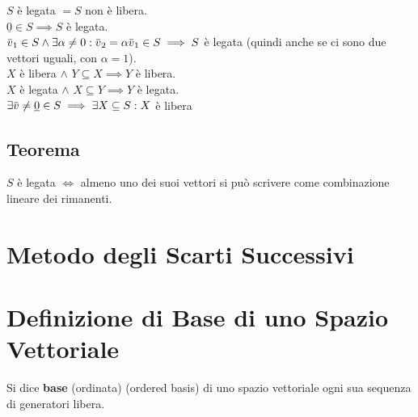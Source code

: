 \documentclass[a4paper, twoside, italian, 11pt]{book}
\newcommand{\braces}[1] {\left \{ #1 \right \}}
\newcommand{\overbar}[1] {\mkern 1.5mu\overline{\mkern-1.5mu#1\mkern-1.5mu}\mkern 1.5mu}
\begin{document}
\noindent
$S$ è legata $= S$ non è libera. \\
$\underline 0 \in S \implies S$ è legata. \\
$\overbar v_1 \in S \land \exists \alpha \neq 0 : \overbar v_2 = \alpha \overbar v_1 \in S \implies S$ è legata (quindi anche se ci sono due vettori uguali, con $\alpha = 1$). \\
$X$ è libera $\land$ $Y \subseteq X \implies Y$ è libera. \\
$X$ è legata $\land$ $X \subseteq Y \implies Y$ è legata. \\
$\exists \overbar v \neq \underline 0 \in S \implies \exists X \subseteq S : X$ è libera

\subsection{Teorema}

$S$ è legata $\iff$ almeno uno dei suoi vettori si può scrivere come combinazione lineare dei rimanenti.









\section{Metodo degli Scarti Successivi}




\section{Definizione di Base di uno Spazio Vettoriale}

Si dice \textbf{base} (ordinata) (ordered basis) di uno spazio vettoriale ogni sua sequenza di generatori libera. \\
\end{document}

